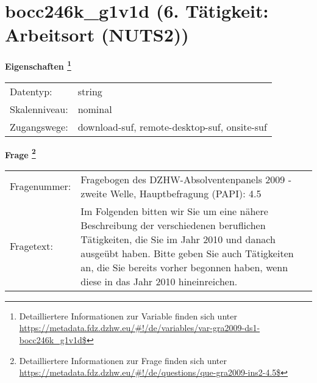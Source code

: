 
    \setcounter{footnote}{0}

    \vspace*{-1.8cm}
	\section{bocc246k\_g1v1d (6. Tätigkeit: Arbeitsort (NUTS2))}
	\label{section:bocc246k_g1v1d}



    \vspace*{0.5cm}
    \noindent\textbf{Eigenschaften
	\footnote{Detailliertere Informationen zur Variable finden sich unter
		\url{https://metadata.fdz.dzhw.eu/\#!/de/variables/var-gra2009-ds1-bocc246k_g1v1d$}}}\\
	\begin{tabularx}{\hsize}{@{}lX}
	Datentyp: & string \\
	Skalenniveau: & nominal \\
	Zugangswege: &
	  download-suf, 
	  remote-desktop-suf, 
	  onsite-suf
 \\
    \end{tabularx}



				\vspace*{0.5cm}
                \noindent\textbf{Frage
	                \footnote{Detailliertere Informationen zur Frage finden sich unter
		              \url{https://metadata.fdz.dzhw.eu/\#!/de/questions/que-gra2009-ins2-4.5$}}}\\
				\begin{tabularx}{\hsize}{@{}lX}
					Fragenummer: &
					  Fragebogen des DZHW-Absolventenpanels 2009 - zweite Welle, Hauptbefragung (PAPI):
					  4.5
 \\
					Fragetext: & Im Folgenden bitten wir Sie um eine nähere Beschreibung der verschiedenen beruflichen Tätigkeiten, die Sie im Jahr 2010 und danach ausgeübt haben. Bitte geben Sie auch Tätigkeiten an, die Sie bereits vorher begonnen haben, wenn diese in das Jahr 2010 hineinreichen. \\
				\end{tabularx}





